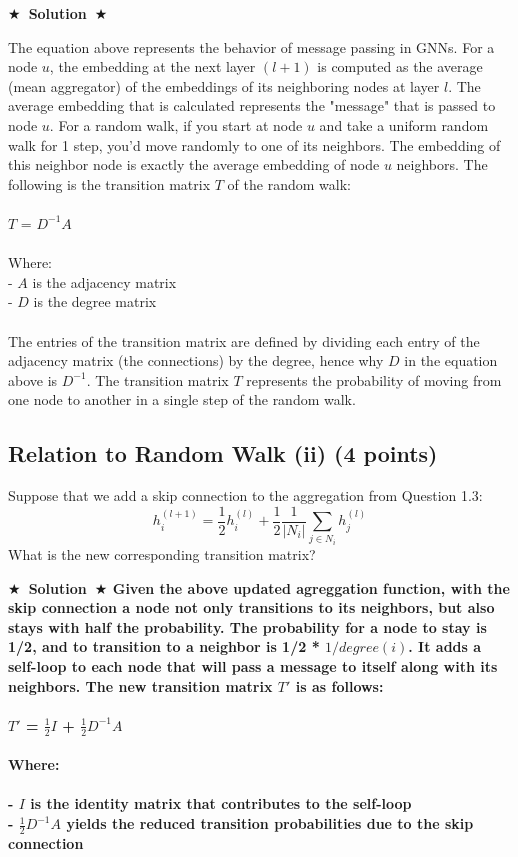 \documentclass{article}
\numberwithin{figure}{section}
\newcommand{\Solution}[1]{{\medskip \color{red} \bf $\bigstar$~\sf \textbf{Solution}~$\bigstar$ \sf #1 } \bigskip}
\begin{document}
\Solution{

The equation above represents the behavior of message passing in GNNs. For a node $u$, the embedding at the next layer $(l + 1)$ is computed as the average (mean aggregator) of the embeddings of its neighboring nodes at layer $l$. The average embedding that is calculated represents the "message" that is passed to node $u$. For a random walk, if you start at node $u$ and take a uniform random walk for 1 step, you'd move randomly to one of its neighbors. The embedding of this neighbor node is exactly the average embedding of node $u$ neighbors. The following is the transition matrix $T$ of the random walk:
\\
\\
$T$ = $D^{-1}$$A$
\\
\\
Where:
\\
- $A$ is the adjacency matrix
\\
- $D$ is the degree matrix
\\
\\
The entries of the transition matrix are defined by dividing each entry of the adjacency matrix (the connections) by the degree, hence why $D$ in the equation above is $D^{-1}$. The transition matrix $T$ represents the probability of moving from one node to another in a single step of the random walk.

}


\subsection{Relation to Random Walk (ii) (4 points)}

Suppose that we add a skip connection to the aggregation from Question 1.3:
$$h^{(l+1)}_i = \frac{1}{2}h^{(l)}_i + \frac{1}{2}\frac{1}{|N_i|} \sum_{j \in N_i} h^{(l)}_j$$
What is the new corresponding transition matrix?

\Solution{
Given the above updated agreggation function, with the skip connection a node not only transitions to its neighbors, but also stays with half the probability. The probability for a node to stay is 1/2, and to transition to a neighbor is 1/2 * $1/degree(i)$. It adds a self-loop to each node that will pass a message to itself along with its neighbors. The new transition matrix $T{'}$ is as follows:
\\
\\

$T{'}$ = $\frac{1}{2}$$I$ + $\frac{1}{2}$$D^{-1}$$A$
\\
\\
Where:\\\\
- $I$ is the identity matrix that contributes to the self-loop\\
- $\frac{1}{2}$$D^{-1}$$A$ yields the reduced transition probabilities due to the skip connection

}
\end{document}
